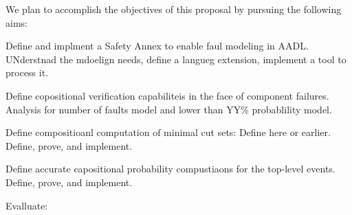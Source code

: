 We plan to accomplish the objectives of this proposal by pursuing the following aims:

Define and implment a Safety Annex to enable faul modeling in AADL. UNderstnad the mdoelign needs, define a langueg extension, implement a tool to process it. 

Define copositional verification capabiliteis in the face of component failures. Analysis for number of faults model and lower than YY\% probablility model. 

Define compositioanl computation of minimal cut sets: Define here or earlier. Define, prove, and implement.

Define accurate capositional probability compustiaons for the top-level events. Define, prove, and implement.

Evalluate:

